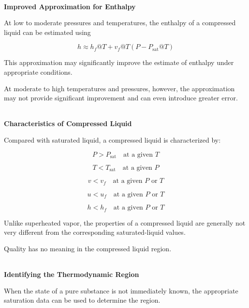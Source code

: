 \documentclass[12pt]{article}
\begin{document}
\textbf{\\ Improved Approximation for Enthalpy}

At low to moderate pressures and temperatures, the enthalpy of a compressed liquid can be estimated using

\begin{equation*}
\boxed{
h\approx h_f@T+v_f@T
\left(P-P_{\mathrm{sat}}@T\right)
}
\end{equation*}

This approximation may significantly improve the estimate of enthalpy under appropriate conditions.

At moderate to high temperatures and pressures, however, the approximation may not provide significant improvement and can even introduce greater error.

\textbf{\\ Characteristics of Compressed Liquid}

Compared with saturated liquid, a compressed liquid is characterized by:

\begin{equation*}
\boxed{P>P_{\mathrm{sat}}\quad\text{at a given }T}
\end{equation*}

\begin{equation*}
\boxed{T<T_{\mathrm{sat}}\quad\text{at a given }P}
\end{equation*}

\begin{equation*}
\boxed{v<v_f\quad\text{at a given }P\text{ or }T}
\end{equation*}

\begin{equation*}
\boxed{u<u_f\quad\text{at a given }P\text{ or }T}
\end{equation*}

\begin{equation*}
\boxed{h<h_f\quad\text{at a given }P\text{ or }T}
\end{equation*}

Unlike superheated vapor, the properties of a compressed liquid are generally not very different from the corresponding saturated-liquid values.

Quality has no meaning in the compressed liquid region.

\textbf{\\ Identifying the Thermodynamic Region}

When the state of a pure substance is not immediately known, the appropriate saturation data can be used to determine the region.
\end{document}
